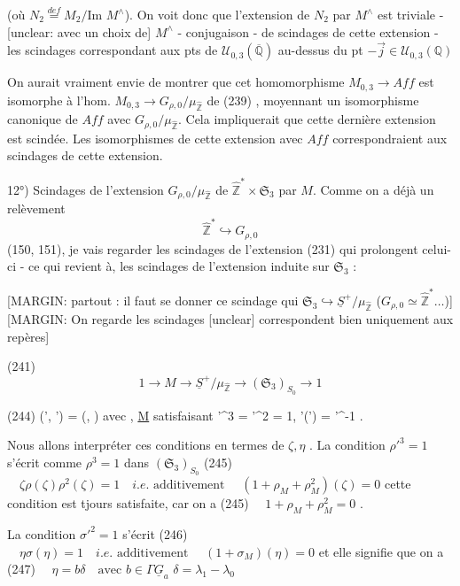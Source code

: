 (où $N_2 \overset{def}{=} M_2 / \text{Im } M^\wedge$). On voit donc
que l'extension de $N_2$ par $M^\wedge$ est triviale
- [unclear: avec un choix de] $M^\wedge$ - conjugaison -
de scindages de cette extension - les
scindages correspondant aux pts de
$\mathcal{U}_{0,3}(\overline{\mathbb{Q}})$ au-dessus du pt $-\vec{j} \in \mathcal{U}_{0,3}(\mathbb{Q})$

\newpage


On aurait vraiment envie de montrer que
cet homomorphisme $M_{0,3} \to Aff$ est isomorphe
à l'hom. $M_{0,3} \to G_{\rho,0}/\mu_{\hat{\mathbb{Z}}}$ de (239) , moyennant
un isomorphisme canonique de
$Aff$ avec $G_{\rho,0}/\mu_{\hat{\mathbb{Z}}}$. Cela impliquerait que
cette dernière extension est scindée. Les
isomorphismes de cette extension avec $Aff$
correspondraient aux scindages de cette
extension.

12°) Scindages de l'extension $G_{\rho,0}/\mu_{\hat{\mathbb{Z}}}$ de $\hat{\mathbb{Z}}^* \times \mathfrak{S}_3$ par $M$.
Comme on a déjà un relèvement
$$ \hat{\mathbb{Z}}^* \hookrightarrow G_{\rho,0} $$
(150, 151), je vais regarder les scindages
de l'extension (231) qui prolongent celui-ci -
ce qui revient à, les
scindages de l'extension induite sur $\mathfrak{S}_3$ :

[MARGIN: partout : il faut se donner ce scindage qui $\mathfrak{S}_3 \hookrightarrow \underline{S}^+ / \mu_{\hat{\mathbb{Z}}}$ ($G_{\rho,0} \simeq \hat{\mathbb{Z}}^* \dots$)]
[MARGIN: On regarde les scindages [unclear] correspondent bien uniquement aux repères]

(241) $$ 1 \to M \to \underline{S}^+ / \mu_{\hat{\mathbb{Z}}} \to (\mathfrak{S}_3)_{S_0} \to 1 $$

\newpage


(244) \quad (\rho', \sigma') = (\zeta \rho, \eta \sigma) \quad avec \quad \zeta, \eta \in \Gamma \underline{M}
satisfaisant
\rho'^3 = \sigma'^2 = 1, \quad \sigma'(\rho') = \rho'^{-1} .

Nous allons interpréter ces conditions en
termes de $\zeta, \eta$ . La condition $\rho'^3 = 1$ s'écrit
comme $\rho^3 = 1$ dans $(\mathfrak{S}_3)_{S_0}$
(245) $\quad \zeta \rho(\zeta) \rho^2(\zeta) = 1 \quad i.e. \text{ additivement } \quad (1+\rho_M+\rho_M^2)(\zeta) = 0$
cette condition est tjours satisfaite, car on a
(245) $\quad 1 + \rho_M + \rho_M^2 = 0$ .

La condition $\sigma'^2 = 1$ s'écrit
(246) $\quad \eta \sigma(\eta) = 1 \quad i.e. \text{ additivement } \quad (1+\sigma_M)(\eta) = 0$
et elle signifie que on a
(247) $\quad \eta = b \delta \quad \text{avec } b \in \Gamma \underline{G}_a$
$\delta = \lambda_1 - \lambda_0$

